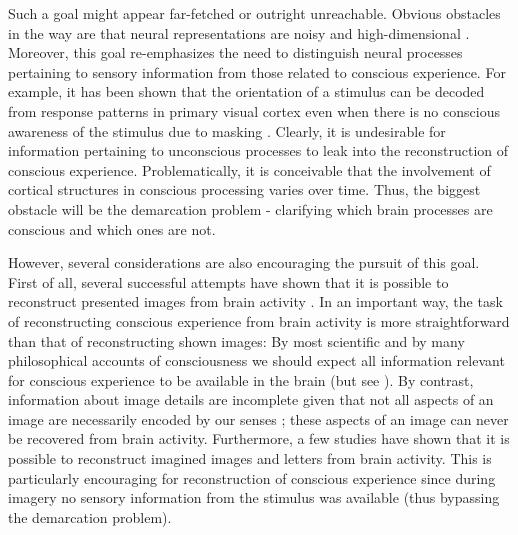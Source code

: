 Such a goal might appear far-fetched or outright unreachable. Obvious obstacles in the way are that neural representations are noisy and high-dimensional \parencite{StYves2019}. Moreover, this goal re-emphasizes the need to distinguish neural processes pertaining to sensory information from those related to conscious experience. For example, it has been shown that the orientation of a stimulus can be decoded from response patterns in primary visual cortex even when there is no conscious awareness of the stimulus due to masking \parencite{Haynes2005}. Clearly, it is undesirable for information pertaining to unconscious processes to leak into the reconstruction of conscious experience. Problematically, it is conceivable that the involvement of cortical structures in conscious processing varies over time. Thus, the biggest obstacle will be the demarcation problem - clarifying which brain processes are conscious and which ones are not.

However, several considerations are also encouraging the pursuit of this goal. First of all, several successful attempts have shown that it is possible to reconstruct presented images from brain activity \parencite{Thirion2006, Miyawaki2008, Naselaris2009, Nishimoto2011, Schoenmakers2013, Senden2018, VanGerven2018, StYves2019}. In an important way, the task of reconstructing conscious experience from brain activity is more straightforward than that of reconstructing shown images: By most scientific and by many philosophical accounts of consciousness we should expect all information relevant for conscious experience to be available in the brain (but see \cite{ORegan2001}). By contrast, information about image details are incomplete given that not all aspects of an image are necessarily encoded by our senses \parencite{StYves2019}; these aspects of an image can never be recovered from brain activity. Furthermore, a few studies have shown that it is possible to reconstruct imagined images \parencite{Naselaris2015b} and letters \parencite{Senden2018} from brain activity. This is particularly encouraging for reconstruction of conscious experience since during imagery no sensory information from the stimulus was available (thus bypassing the demarcation problem).

